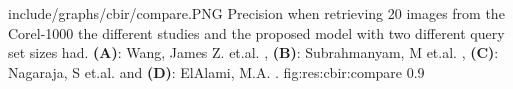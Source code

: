 \singlefigurenear
{include/graphs/cbir/compare.PNG}
{Precision when retrieving 20 images from the Corel-1000 the different studies and the proposed model with two different query set sizes had. \textbf{(A)}: Wang, James Z. et.al. \cite{wang2001simplicity}, \textbf{(B)}: Subrahmanyam, M et.al. \cite{subrahmanyam2013modified}, \textbf{(C)}: Nagaraja, S et.al. \cite{nagaraja2015low} and \textbf{(D)}: ElAlami, M.A. \cite{elalami2014new}. }
{fig:res:cbir:compare}
{0.9}


